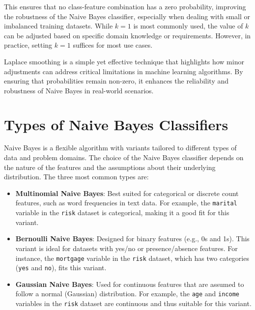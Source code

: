 \documentclass[
]{book}
\newcommand{\passthrough}[1]{#1}
\theoremstyle{definition}
\theoremstyle{definition}
\theoremstyle{definition}
\theoremstyle{definition}
\theoremstyle{remark}
\begin{document}
This ensures that no class-feature combination has a zero probability, improving the robustness of the Naive Bayes classifier, especially when dealing with small or imbalanced training datasets. While \(k = 1\) is most commonly used, the value of \(k\) can be adjusted based on specific domain knowledge or requirements. However, in practice, setting \(k = 1\) suffices for most use cases.

Laplace smoothing is a simple yet effective technique that highlights how minor adjustments can address critical limitations in machine learning algorithms. By ensuring that probabilities remain non-zero, it enhances the reliability and robustness of Naive Bayes in real-world scenarios.

\section{Types of Naive Bayes Classifiers}\label{types-of-naive-bayes-classifiers}

Naive Bayes is a flexible algorithm with variants tailored to different types of data and problem domains. The choice of the Naive Bayes classifier depends on the nature of the features and the assumptions about their underlying distribution. The three most common types are:

\begin{itemize}
\item
  \textbf{Multinomial Naive Bayes}: Best suited for categorical or discrete count features, such as word frequencies in text data. For example, the \passthrough{\lstinline!marital!} variable in the \passthrough{\lstinline!risk!} dataset is categorical, making it a good fit for this variant.
\item
  \textbf{Bernoulli Naive Bayes}: Designed for binary features (e.g., 0s and 1s). This variant is ideal for datasets with yes/no or presence/absence features. For instance, the \passthrough{\lstinline!mortgage!} variable in the \passthrough{\lstinline!risk!} dataset, which has two categories (\passthrough{\lstinline!yes!} and \passthrough{\lstinline!no!}), fits this variant.
\item
  \textbf{Gaussian Naive Bayes}: Used for continuous features that are assumed to follow a normal (Gaussian) distribution. For example, the \passthrough{\lstinline!age!} and \passthrough{\lstinline!income!} variables in the \passthrough{\lstinline!risk!} dataset are continuous and thus suitable for this variant.
\end{itemize}
\end{document}
